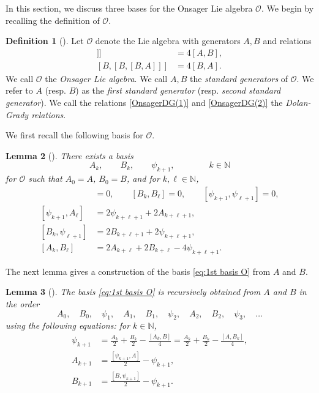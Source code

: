 \documentclass[11pt]{article}%
\theoremstyle{definition}
\newtheorem{definition}{Definition}[section]
\theoremstyle{plain}
\newtheorem{lemma}[definition]{Lemma}
\begin{document}
In this section, we discuss three bases for the Onsager Lie algebra $\mathcal{O}$.
We begin by recalling the definition of $\mathcal{O}$.

\begin{definition}[\cite{1944Ons,1989Perk}]\label{def:Onsager}
Let $\mathcal{O}$ denote the Lie algebra with generators $A,B$ and relations
\begin{align}
	[A,[A,[A,B]]] & =4[A,B], \label{OnsagerDG(1)}\\
	[B,[B,[B,A]]] & =4[B,A]. \label{OnsagerDG(2)}
\end{align}
We call $\mathcal{O}$ the \emph{Onsager Lie algebra}.
We call $A,B$ the \emph{standard generators} of $\mathcal{O}$.
We refer to $A$ (resp. $B$) as the \emph{first standard generator} (resp. \emph{second standard generator}).
We call the relations \eqref{OnsagerDG(1)} and \eqref{OnsagerDG(2)} the \emph{Dolan-Grady relations}.
\end{definition}

We first recall the following basis for $\mathcal{O}$.

\begin{lemma}[{\cite[Theorem~6.3]{2026LeeJOAC}}]\label{O basis}
There exists a basis
\begin{equation}\label{eq:1st basis O}
	A_k, \qquad B_k, \qquad \psi_{k+1}, \qquad \qquad k \in \mathbb{N}
\end{equation}
for $\mathcal{O}$ such that $A_0 = A$, $B_0 = B$, and for $k, \ell \in \mathbb{N}$,
\begin{align}
	[A_k, A_\ell] & = 0, \qquad
	[B_k, B_\ell] = 0, \qquad
	[\psi_{k+1}, \psi_{\ell+1}] = 0, \label{thm0312:eq[A,B,psi]}\\[0.2em]
	[\psi_{k+1}, A_\ell] & = 2\psi_{k+\ell+1} + 2A_{k+\ell+1}, \label{thm0312:eq[psi,A]}\\[0.2em]
	[B_k, \psi_{\ell+1}] & = 2B_{k+\ell+1} + 2\psi_{k+\ell+1}, \label{thm0312:eq[B,psi]}\\[0.2em]
	[A_k, B_\ell] & = 2A_{k+\ell} + 2B_{k+\ell} - 4\psi_{k+\ell+1}. \label{thm0312:eq[A,B]}
\end{align}
\end{lemma}

The next lemma gives a construction of the basis \eqref{eq:1st basis O} from $A$ and $B$.

\begin{lemma}[{\cite[Corollary~6.5]{2026LeeJOAC}}]\label{lem:1st-rec}
The basis \eqref{eq:1st basis O} is recursively obtained from $A$ and $B$ in the order 
$$
	A_0, \quad B_0, \quad \psi_1, \quad 
	A_1, \quad B_1, \quad \psi_2, \quad 
	A_2, \quad B_2, \quad \psi_3, \quad \ldots
$$
using the following equations: for $k \in \mathbb{N}$,
\begin{align}
	\psi_{k+1} & = \frac{A_{k}}{2} + \frac{B_{k}}{2} - \frac{[A_{k}, B]}{4} = \frac{A_{k}}{2} + \frac{B_{k}}{2} - \frac{[A, B_k]}{4}, \label{cor:0312 psi}\\
	A_{k+1} & = \frac{[\psi_{k+1}, A]}{2} - \psi_{k+1}, \label{cor:0312 A}\\
	B_{k+1} & = \frac{[B, \psi_{k+1}]}{2} - \psi_{k+1}. \label{cor:0312 B}
\end{align}
\end{lemma}
\end{document}
